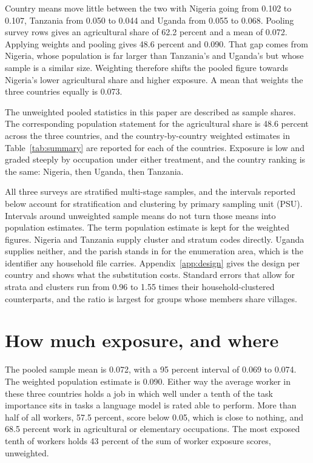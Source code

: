 Country means move little between the two with Nigeria going from 0.102 to 0.107,
Tanzania from 0.050 to 0.044 and Uganda from 0.055 to 0.068. 
Pooling survey rows gives an agricultural share of 62.2
percent and a mean of 0.072. Applying weights and pooling gives 48.6 percent
and 0.090. That gap comes from Nigeria, whose population is far larger than
Tanzania's and Uganda's but whose sample is a similar size. Weighting therefore
shifts the pooled figure towards Nigeria's lower agricultural share and higher
exposure. A mean that weights the three countries
equally is 0.073.

The unweighted pooled statistics in this paper are described as sample
shares. The corresponding population statement for the
agricultural share is 48.6 percent across the three countries, and the
country-by-country weighted estimates in Table~\ref{tab:summary} are reported 
for each of the countries. Exposure
is low and graded steeply by occupation under either treatment, and the country
ranking is the same: Nigeria, then Uganda, then Tanzania.

All three surveys are stratified multi-stage samples, and the intervals
reported below account for stratification and clustering by primary sampling
unit (PSU). Intervals around
unweighted sample means do not turn those means into population estimates. The
term population estimate is kept for the weighted figures. 
Nigeria and Tanzania supply cluster and stratum codes
directly. Uganda supplies neither, and the parish stands in for the enumeration
area, which is the identifier any household file carries.
Appendix~\ref{app:design} gives the design per country and shows what the
substitution costs. 
Standard errors that allow for strata and clusters run from 0.96 to 1.55 times
their household-clustered counterparts, and the ratio is largest for groups 
whose members share villages.

\section{How much exposure, and where}

The pooled sample mean is 0.072, with a 95 percent interval of 0.069 to 0.074.
The weighted population estimate is 0.090. 
Either way the average worker in these three
countries holds a job in which well under a tenth of the task importance sits in
tasks a language model is rated able to perform. 
More than half of all workers, 57.5
percent, score below 0.05, which is close to nothing, and 68.5 percent work in
agricultural or elementary occupations. The most exposed tenth of workers
holds 43 percent of the sum of worker exposure scores, unweighted.

